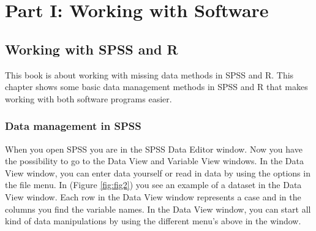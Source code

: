 \documentclass[
]{book}
\begin{document}
\hypertarget{part-part-i-working-with-software}{%
\part{Part I: Working with Software}\label{part-part-i-working-with-software}}

\hypertarget{working-with-spss-and-r}{%
\chapter{Working with SPSS and R}\label{working-with-spss-and-r}}

This book is about working with missing data methods in SPSS and R. This chapter shows some basic data management methods in SPSS and R that makes working with both software programs easier.

\hypertarget{data-management-in-spss}{%
\section{Data management in SPSS}\label{data-management-in-spss}}

When you open SPSS you are in the SPSS Data Editor window. Now you have the possibility to go to the Data View and Variable View windows. In the Data View window, you can enter data yourself or read in data by using the options in the file menu. In (Figure \ref{fig:fig2}) you see an example of a dataset in the Data View window. Each row in the Data View window represents a case and in the columns you find the variable names. In the Data View window, you can start all kind of data manipulations by using the different menu's above in the window.
\end{document}
